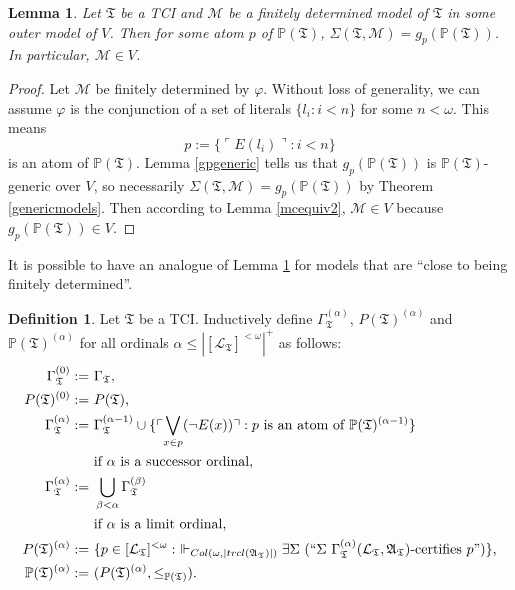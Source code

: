 \documentclass[12pt, twoside]{memoir}
\numberwithin{equation}{section}
\newtheorem{lem}[thm]{Lemma}
\theoremstyle{definition}
\newtheorem{defi}[thm]{Definition}
\theoremstyle{remark}
\theoremstyle{definition}
\theoremstyle{definition}
\theoremstyle{definition}
\theoremstyle{remark}
\begin{document}
\begin{lem}\label{findetinV}
Let $\mathfrak{T}$ be a TCI and $\mathcal{M}$ be a finitely determined model of $\mathfrak{T}$ in some outer model of $V$. Then for some atom $p$ of $\mathbb{P}(\mathfrak{T})$, $\Sigma(\mathfrak{T}, \mathcal{M}) = g_p (\mathbb{P}(\mathfrak{T}))$. In particular, $\mathcal{M} \in V$.
\end{lem}

\begin{proof}
Let $\mathcal{M}$ be finitely determined by $\varphi$. Without loss of generality, we can assume $\varphi$ is the conjunction of a set of literals $\{l_i : i < n\}$ for some $n < \omega$. This means $$p := \{\ulcorner E(l_i) \urcorner : i < n\}$$ is an atom of $\mathbb{P}(\mathfrak{T})$. Lemma \ref{gpgeneric} tells us that $g_p (\mathbb{P}(\mathfrak{T}))$ is $\mathbb{P}(\mathfrak{T})$-generic over $V$, so necessarily $\Sigma(\mathfrak{T}, \mathcal{M}) = g_p (\mathbb{P}(\mathfrak{T}))$ by Theorem \ref{genericmodels}. Then according to Lemma \ref{mcequiv2}, $\mathcal{M} \in V$ because $g_p (\mathbb{P}(\mathfrak{T})) \in V$.
\end{proof}

It is possible to have an analogue of Lemma \ref{findetinV} for models that are ``close to being finitely determined''.

\begin{defi}\label{CB1}
Let $\mathfrak{T}$ be a TCI. Inductively define $\Gamma_{\mathfrak{T}}^{(\alpha)}$, $P(\mathfrak{T})^{(\alpha)}$ and $\mathbb{P}(\mathfrak{T})^{(\alpha)}$ for all ordinals $\alpha \leq |[\mathcal{L}_{\mathfrak{T}}]^{< \omega}|^+$ as follows:
\begin{align*}
    \Gamma_{\mathfrak{T}}^{(0)} := \ & \Gamma_{\mathfrak{T}} \text{,} \\
    P(\mathfrak{T})^{(0)} := \ & P(\mathfrak{T}) \text{,} \\
    \Gamma_{\mathfrak{T}}^{(\alpha)} := \ & \Gamma_{\mathfrak{T}}^{(\alpha - 1)} \cup \{\ulcorner \bigvee_{x \in p} (\neg E(x)) \urcorner : p \text{ is an atom of } \mathbb{P}(\mathfrak{T})^{(\alpha - 1)}\} \\
    & \text{if } \alpha \text{ is a successor ordinal,} \\
    \Gamma_{\mathfrak{T}}^{(\alpha)} := \ & \bigcup_{\beta < \alpha} \Gamma_{\mathfrak{T}}^{(\beta)} \\
    & \text{if } \alpha \text{ is a limit ordinal,} \\
    P(\mathfrak{T})^{(\alpha)} := \ & \{p \in [\mathcal{L}_{\mathfrak{T}}]^{< \omega} : \ \Vdash_{Col(\omega, |trcl(\mathfrak{A}_{\mathfrak{T}})|)} \exists \Sigma \ (``\Sigma \ \Gamma_{\mathfrak{T}}^{(\alpha)} (\mathcal{L}_{\mathfrak{T}}, \mathfrak{A}_{\mathfrak{T}})\text{-certifies } p")\} \text{,} \\
    \mathbb{P}(\mathfrak{T})^{(\alpha)} := \ & (P(\mathfrak{T})^{(\alpha)}, \leq_{\mathbb{P}(\mathfrak{T})}) \text{.}
\end{align*}
\end{defi}
\end{document}
